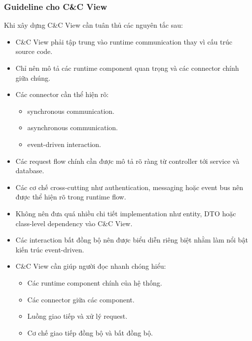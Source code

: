 \subsubsection*{Guideline cho C\&C View}

Khi xây dựng C\&C View cần tuân thủ các nguyên tắc sau:

\begin{itemize}
    \item C\&C View phải tập trung vào runtime communication thay vì cấu trúc source code.
    
    \item Chỉ nên mô tả các runtime component quan trọng và các connector chính giữa chúng.
    
    \item Các connector cần thể hiện rõ:
    \begin{itemize}
        \item synchronous communication.
        \item asynchronous communication.
        \item event-driven interaction.
    \end{itemize}
    
    \item Các request flow chính cần được mô tả rõ ràng từ controller tới service và database.
    
    \item Các cơ chế cross-cutting như authentication, messaging hoặc event bus nên được thể hiện rõ trong runtime flow.
    
    \item Không nên đưa quá nhiều chi tiết implementation như entity, DTO hoặc class-level dependency vào C\&C View.
    
    \item Các interaction bất đồng bộ nên được biểu diễn riêng biệt nhằm làm nổi bật kiến trúc event-driven.
    
    \item C\&C View cần giúp người đọc nhanh chóng hiểu:
    \begin{itemize}
        \item Các runtime component chính của hệ thống.
        \item Các connector giữa các component.
        \item Luồng giao tiếp và xử lý request.
        \item Cơ chế giao tiếp đồng bộ và bất đồng bộ.
    \end{itemize}
\end{itemize}


